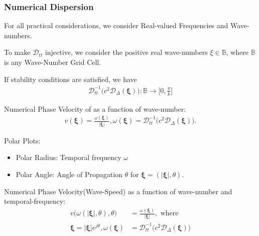 \documentclass{beamer}
\begin{document}
\begin{frame}
\frametitle{Numerical Dispersion}
For all practical considerations, we consider Real-valued Frequencies and Wave-numbers.

To make $\mathcal{D}_{tt}$ injective, we consider the positive real wave-numbers $\xi \in \mathbb{B}$, where $\mathbb{B}$ is any Wave-Number Grid Cell.

If stability conditions are satisfied, we have
\begin{align}
\mathcal{D}_{tt}^{-1}\bigg( c^2 \mathcal{D}_{\Delta}(\mathbf{\xi})\bigg) : \mathbb{B}  \rightarrow \bigg[0, \frac{\pi}{k}\bigg]
\end{align}

Numerical Phase Velocity of as a function of wave-number:
\begin{align}
v(\mathbf{\xi}) = \frac{\omega(\mathbf{\xi})}{|\mathbf{\xi}|}, \omega(\mathbf{\xi}) = \mathcal{D}_{tt}^{-1}\bigg( c^2 \mathcal{D}_{\Delta}(\mathbf{\xi})\bigg).
\end{align}

Polar Plots: 
\begin{itemize}
\item Polar Radius: Temporal frequency $\omega$
\item Polar Angle: Angle of Propagation $\theta$ for $\mathbf{\xi} = (|\mathbf{\xi}|,\theta)$.
\end{itemize}

Numerical Phase Velocity(Wave-Speed) as a function of wave-number and temporal-frequency:
\begin{align*}
v\big(\omega(|\mathbf{\xi}|,\theta), \theta ) &= \frac{\omega(\mathbf{\xi})}{|\mathbf{\xi}|}, \text{ where }\\
\mathbf{\xi} = |\mathbf{\xi}|e^{j\theta}, \omega(\mathbf{\xi}) &= \mathcal{D}_{tt}^{-1}\bigg( c^2 \mathcal{D}_{\Delta}(\mathbf{\xi})\bigg)
\end{align*}

 
\end{frame}
\end{document}
